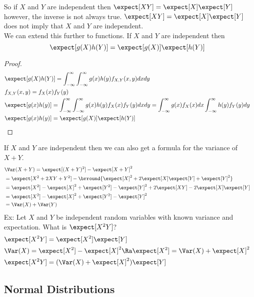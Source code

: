 So if $X$ and $Y$ are independent then $\expect[XY]=\expect[X]\expect[Y]$ however, the inverse is not always true. $\expect[XY]=\expect[X]\expect[Y]$ does not imply that $X$ and $Y$ are independent.\\
We can extend this further to functions. If $X$ and $Y$ are independent then
\[\expect[g(X)h(Y)]=\expect[g(X)]\expect[h(Y)]\]
\begin{proof}
\begin{align*}
    &\expect[g(X)h(Y)]=\int_{-\infty}^\infty\int_{-\infty}^\infty g(x)h(y) f_{X,Y}(x,y)dxdy\\
    &f_{X,Y}(x,y)=f_X(x)f_Y(y)\\
    &\expect[g(x)h(y)]=\int_{-\infty}^\infty\int_{-\infty}^\infty g(x)h(y) f_X(x)f_Y(y)dxdy=\int_{-\infty}^\infty g(x)f_X(x)dx\int_{-\infty}^\infty h(y)f_Y(y)dy\\
    &\expect[g(x)h(y)]=\expect[g(X)]\expect[h(Y)]
\end{align*}
\end{proof}
If $X$ and $Y$ are independent then we can also get a formula for the variance of $X+Y$.
\begin{align*}
    &\Var(X+Y)=\expect[(X+Y)^2]-\expect[X+Y]^2\\
    &=\expect[X^2+2XY+Y^2]-\brround{\expect[X]^2+2\expect[X]\expect[Y]+\expect[Y]^2}\\
    &=\expect[X^2]-\expect[X]^2+\expect[Y^2]-\expect[Y]^2+2\expect[XY]-2\expect[X]\expect[Y]\\
    &=\expect[X^2]-\expect[X]^2+\expect[Y^2]-\expect[Y]^2\\
    &=\Var(X)+\Var(Y)
\end{align*}
Ex: Let $X$ and $Y$ be independent random variables with known variance and expectation. What is $\expect[X^2Y]$?
\begin{align*}
    &\expect[X^2Y]=\expect[X^2]\expect[Y]\\
    &\Var(X)=\expect[X^2]-\expect[X]^2\Ra\expect[X^2]=\Var(X)+\expect[X]^2\\
    &\expect[X^2Y]=(\Var(X)+\expect[X]^2)\expect[Y]
\end{align*}

\subsection{Normal Distributions}

